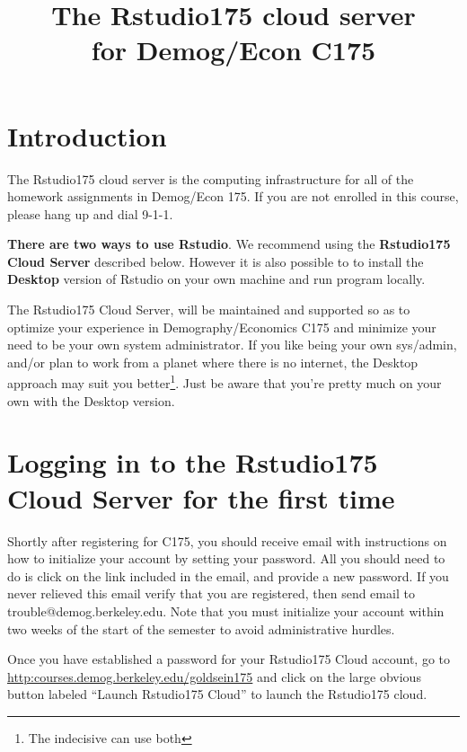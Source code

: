 \documentclass[11pt]{article}
\begin{document}
\title{The Rstudio175 cloud server\\
for Demog/Econ C175}

\maketitle
\tableofcontents

\section{Introduction}

The Rstudio175 cloud server is the computing infrastructure for all of the homework assignments in Demog/Econ 175. If you are not enrolled in this course, please hang up and dial 9-1-1.
\begin{mdframed}[backgroundcolor=blue!20]        
\textbf{There are two ways to use Rstudio}. We recommend using the \textbf{Rstudio175 Cloud Server} described below. However it is also possible to  to install the \textbf{Desktop} version of  Rstudio on your own machine and run program locally.

The Rstudio175 Cloud Server, will be maintained and supported so as to optimize your experience in Demography/Economics C175 and minimize your need to be your own system administrator.  If you like being your own sys/admin, and/or plan to work from a planet where there is no internet, the Desktop approach may suit you better\footnote{The indecisive can use both}. Just be aware that you're pretty much on your own with the Desktop version.  
\end{mdframed}
\section{Logging in to the Rstudio175 Cloud Server for the first time}

Shortly after registering for C175, you should receive email with instructions on how to initialize your account by setting your password.  All you should need to do is click on the link included in the email, and provide a new password.  If you never relieved this email verify that you are registered, then send email to trouble@demog.berkeley.edu.  Note that you must initialize your account within two weeks of the start of the semester to avoid administrative hurdles.

Once you have established a password for your Rstudio175 Cloud account, go to 
\url{http:courses.demog.berkeley.edu/goldsein175} and click on the large obvious button labeled ``Launch Rstudio175 Cloud'' to launch the Rstudio175 cloud.
\end{document}
